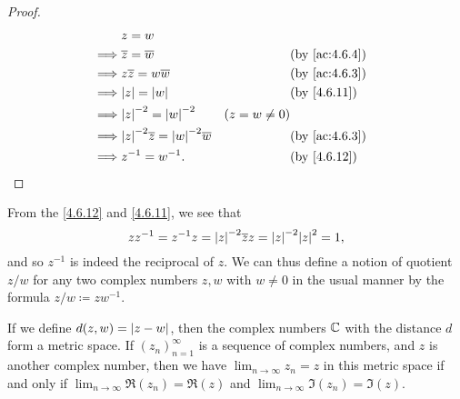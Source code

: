 \begin{proof}
  \begin{align*}
             & z = w                                                                                                \\
    \implies & \overline{z} = \overline{w}                           &                & \text{(by \cref{ac:4.6.4})} \\
    \implies & z \overline{z} = w \overline{w}                       &                & \text{(by \cref{ac:4.6.3})} \\
    \implies & \abs{z} = \abs{w}                                     &                & \text{(by \cref{4.6.11})}   \\
    \implies & \abs{z}^{-2} = \abs{w}^{-2}                           & (z = w \neq 0)                               \\
    \implies & \abs{z}^{-2} \overline{z} = \abs{w}^{-2} \overline{w} &                & \text{(by \cref{ac:4.6.3})} \\
    \implies & z^{-1} = w^{-1}.                                      &                & \text{(by \cref{4.6.12})}
  \end{align*}
\end{proof}

\begin{note}
  From the \cref{4.6.12} and \cref{4.6.11}, we see that
  \[
    z z^{-1} = z^{-1} z = \abs{z}^{-2} \overline{z} z = \abs{z}^{-2} \abs{z}^2 = 1,
  \]
  and so \(z^{-1}\) is indeed the reciprocal of \(z\).
  We can thus define a notion of quotient \(z / w\) for any two complex numbers \(z, w\) with \(w \neq 0\) in the usual manner by the formula \(z / w \coloneqq z w^{-1}\).
\end{note}

\begin{lem}\label{4.6.13}
  If we define \(d(z, w) = \left\lvert z - w\right\rvert\), then the complex numbers \(\mathbb{C}\) with the distance \(d\) form a metric space.
  If \((z_n)_{n = 1}^\infty\) is a sequence of complex numbers, and \(z\) is another complex number, then we have \(\lim_{n \to \infty} z_n = z\) in this metric space if and only if \(\lim_{n \to \infty} \Re(z_n) = \Re(z)\) and \(\lim_{n \to \infty} \Im(z_n) = \Im(z)\).
\end{lem}

